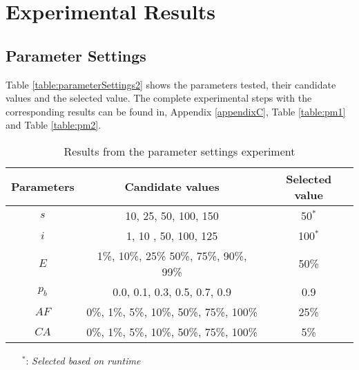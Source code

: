\section{Experimental Results}
\label{sec:expResults}

\subsection{Parameter Settings}
\label{subsec:parameterSettings_results}

Table \vref{table:parameterSettings2} shows the parameters tested, their candidate values and the selected value. The complete experimental steps with the corresponding results can be found in, Appendix \ref{appendixC}, Table \vref{table:pm1} and Table \vref{table:pm2}. 
    \begin{table}[H]
    \centering
    \begin{tabular}{|c|c||c|}
    \hline
    Parameters & Candidate values & Selected value\\
    \hline
    $s$ & 10, 25, 50, 100, 150 & 50$^*$ \\
    $i$ & 1, 10 , 50, 100, 125 & 100$^*$ \\
    $E$ & 1\%, 10\%, 25\% 50\%, 75\%, 90\%, 99\% & 50\% \\
    $p_{b}$ & 0.0, 0.1, 0.3, 0.5, 0.7, 0.9 & 0.9 \\
    $AF$ & 0\%, 1\%, 5\%, 10\%, 50\%, 75\%, 100\% & 25\% \\
    $CA$ & 0\%, 1\%, 5\%, 10\%, 50\%, 75\%, 100\% & 5\% \\
    \hline
    \end{tabular}
    \caption {Results from the parameter settings experiment}
    \begin{itemize}[noitemsep]
    \item[$^*$:] \emph{\color{blue} Selected based on runtime}
    \end{itemize}
    \label{table:parameterSettings2}
    \end{table}

